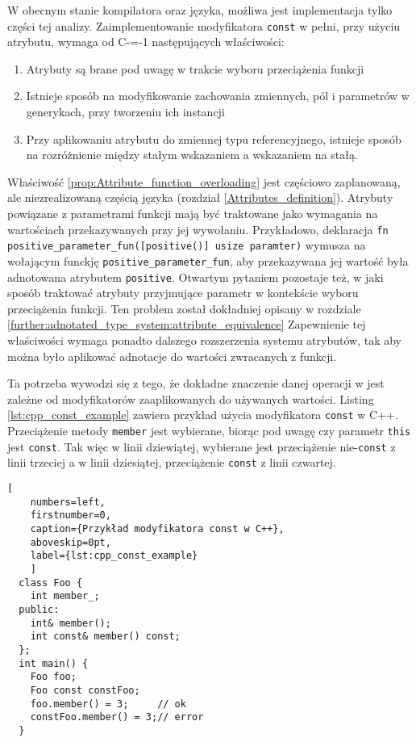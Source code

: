 W obecnym stanie kompilatora oraz języka, możliwa jest implementacja tylko części tej analizy.
Zaimplementowanie modyfikatora \lstinline{const} w pełni, przy użyciu atrybutu, wymaga od C-=-1 następujących właściwości:
\begin{enumerate}
  \item \label{prop:Attribute_function_overloading} Atrybuty są brane pod uwagę w trakcie wyboru przeciążenia funkcji
  \item \label{prop:Generic_adnotations} Istnieje sposób na modyfikowanie zachowania zmiennych, pól i parametrów w generykach, przy tworzeniu ich instancji
  \item \label{prop:Reference_adnotations} Przy aplikowaniu atrybutu do zmiennej typu referencyjnego, istnieje sposób na rozróżnienie między stałym wskazaniem a wskazaniem na stałą.
\end{enumerate}

Właściwość \ref{prop:Attribute_function_overloading} jest częściowo zaplanowaną, ale niezrealizowaną częścią języka (rozdział \ref{Attributes_definition}).
Atrybuty powiązane z parametrami funkcji mają być traktowane jako wymagania na wartościach przekazywanych przy jej wywołaniu. %
Przykładowo, deklaracja \lstinline{fn positive_parameter_fun([positive()] usize paramter)} wymusza na wołającym funckję \lstinline{positive_parameter_fun}, aby przekazywana jej wartość była adnotowana atrybutem \lstinline{positive}.
Otwartym pytaniem pozostaje też, w jaki sposób traktować atrybuty przyjmujące parametr w kontekście wyboru przeciążenia funkcji.
Ten problem został dokładniej opisany w rozdziale \ref{further:adnotated_type_system:attribute_equivalence}
Zapewnienie tej właściwości wymaga ponadto dalszego rozszerzenia systemu atrybutów, tak aby można było aplikować adnotacje do wartości zwracanych z funkcji.

Ta potrzeba wywodzi się z tego, że dokładne znaczenie danej operacji w jest zależne od modyfikatorów zaaplikowanych do używanych wartości.
Listing \ref{lst:cpp_const_example} zawiera przykład użycia modyfikatora \lstinline{const} w C++.
Przeciążenie metody \lstinline{member} jest wybierane, biorąc pod uwagę czy parametr \lstinline{this} jest \lstinline{const}.
Tak więc w linii dziewiątej, wybierane jest przeciążenie nie-\lstinline{const} z linii trzeciej a w linii dziesiątej, przeciążenie \lstinline{const} z linii czwartej.

\begin{minipage}{\linewidth}
  \begin{lstlisting}[
    numbers=left,
    firstnumber=0,
    caption={Przykład modyfikatora const w C++},
    aboveskip=0pt,
    label={lst:cpp_const_example}
    ]
  class Foo {
    int member_;
  public:
    int& member();
    int const& member() const;
  };
  int main() {
    Foo foo;
    Foo const constFoo;
    foo.member() = 3;     // ok
    constFoo.member() = 3;// error
  }
  \end{lstlisting}
\end{minipage}

